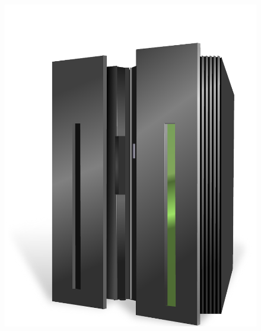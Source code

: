 \documentclass[aspectratio=169]{beamer}
\begin{document}
\begin{frame}
\begin{columns}
\begin{figure}
      \includegraphics[scale=0.2]{images/supercomputer.pdf}
    \end{figure}
  \end{columns}
\end{frame}
\end{document}
